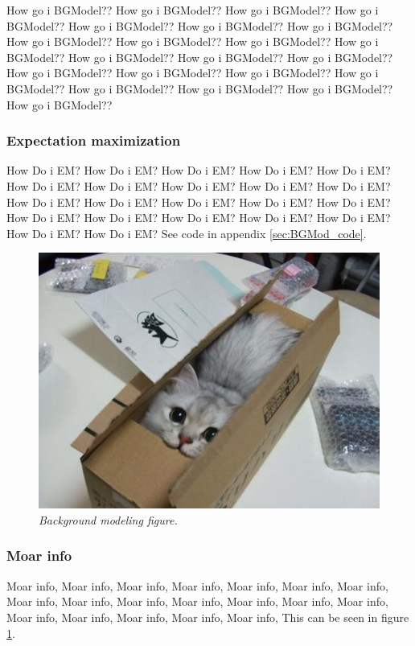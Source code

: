 How go i BGModel?? How go i BGModel?? How go i BGModel?? How go i BGModel?? How go i BGModel?? How go i BGModel?? How go i BGModel?? How go i BGModel?? How go i BGModel?? How go i BGModel?? How go i BGModel?? How go i BGModel?? How go i BGModel?? How go i BGModel?? How go i BGModel?? How go i BGModel?? How go i BGModel?? How go i BGModel?? How go i BGModel?? How go i BGModel?? How go i BGModel?? How go i BGModel??

\subsubsection{Expectation maximization}
How Do i EM? How Do i EM? How Do i EM? How Do i EM? How Do i EM? How Do i EM? How Do i EM? How Do i EM? How Do i EM? How Do i EM? How Do i EM? How Do i EM? How Do i EM? How Do i EM? How Do i EM? How Do i EM? How Do i EM? How Do i EM? How Do i EM? How Do i EM? How Do i EM? How Do i EM? 
See code in appendix \ref{sec:BGMod_code}. %

\begin{figure}[htb]
	\centering
	\includegraphics[width=\linewidth]{images/acatisfinetoo}
	\caption{\textit{Background modeling figure.}}
	\label{fig:BGModeling_fig} %
\end{figure}

\subsubsection{Moar info}
Moar info, Moar info, Moar info, Moar info, Moar info, Moar info, Moar info, Moar info, Moar info, Moar info, Moar info, Moar info, Moar info, Moar info, Moar info, Moar info, Moar info, Moar info, Moar info, 
This can be seen in figure \ref{fig:BGModeling_fig}. %
